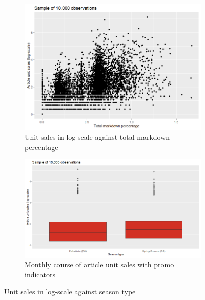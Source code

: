 %
%
%



 \begin{figure}[H]
\centering
\begin{subfigure}{.45\textwidth}
  \centering
  \includegraphics[width=\linewidth]{figures/markdown_against_logsales.png}
  \caption{Unit sales in log-scale against total markdown percentage}
  \label{fig:markdown_against_logsales}
\end{subfigure}
\begin{subfigure}{.45\textwidth}
  \centering
  \includegraphics[width=\linewidth]{figures/season_type_against_logsales.png}
  \caption{Monthly course of article unit sales with promo indicators}
  \label{fig:season_type_against_logsales}
\end{subfigure}
\caption{Unit sales in log-scale against season type}
\label{fig:log_sales_vs_markdown_and_season_type}
\end{figure}




